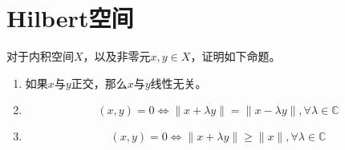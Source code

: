 \documentclass[lang = cn, scheme = chinese, 10pt]{elegantbook}
\newcommand{\C}{\mathbb{C}}  %
\begin{document}
\chapter{Hilbert空间}

\begin{proposition}
	对于内积空间$X$，以及非零元$x,y\in X$，证明如下命题。
	\begin{enumerate}
		\item 如果$x$与$y$正交，那么$x$与$y$线性无关。
		\item 
		$$
		(x,y)=0\iff \|x+\lambda y \|=\|x-\lambda y\|,\forall\lambda\in\C
		$$
		\item 
		$$
		(x,y)=0\iff \|x+\lambda y \|\ge \|x\|,\forall\lambda\in\C
		$$
	\end{enumerate}
\end{proposition}
\end{document}
